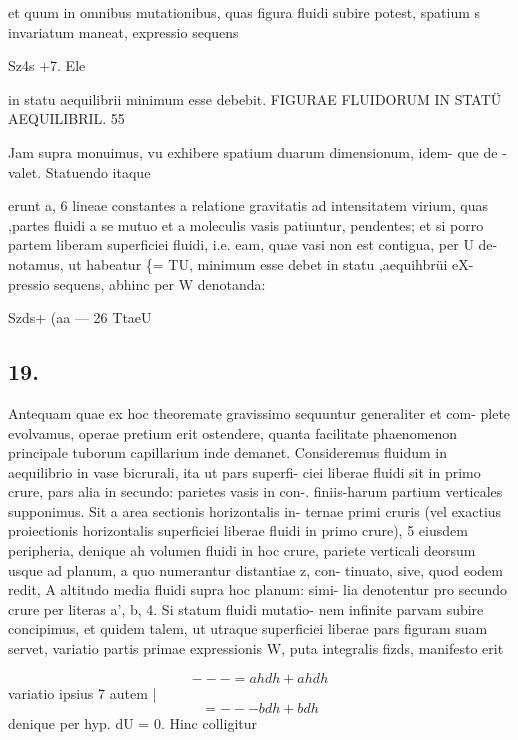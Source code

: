 \documentclass[12pt,a4paper]{article}
\begin{document}
et quum   in omnibus    mutationibus,      quas figura fluidi subire potest, spatium s
invariatum maneat,     expressio sequens

Sz4s +7.                     Ele

in statu aequilibrii minimum esse debebit.
FIGURAE FLUIDORUM IN STATÜ AEQUILIBRIL.                           55

Jam supra monuimus, vu exhibere spatium duarum dimensionum,                    idem-
que de -         valet.   Statuendo itaque



erunt       a, 6 lineae constantes a relatione gravitatis ad intensitatem virium,           quas
,partes fluidi a se mutuo et a moleculis vasis patiuntur, pendentes; et si porro
partem liberam superficiei fluidi, i.e. eam, quae vasi non est contigua, per U de-
notamus, ut habeatur \{= TU,       minimum esse debet in statu ,aequihbrüi eX-
pressio sequens, abhinc per W denotanda:

Szds+ (aa --- 26           TtaeU



\subsection*{19.}

Antequam quae ex hoc theoremate gravissimo sequuntur generaliter et com-
plete evolvamus,  operae pretium erit ostendere,               quanta facilitate phaenomenon
principale tuborum capillarium inde demanet.
Consideremus fluidum in aequilibrio in vase bicrurali, ita ut pars superfi-
ciei liberae fluidi sit in primo crure,        pars alia in secundo:     parietes vasis in con-.
finiis-harum partium verticales supponimus.                Sit a area sectionis horizontalis in-
ternae primi cruris (vel exactius proiectionis horizontalis superficiei liberae fluidi
in primo crure), 5 eiusdem peripheria, denique ah volumen fluidi in hoc crure,
pariete verticali deorsum usque ad planum, a quo numerantur distantiae z, con-
tinuato, sive, quod eodem redit, A altitudo media fluidi supra hoc planum: simi-
lia denotentur pro secundo crure per literas a', b, 4.              Si statum fluidi mutatio-
nem infinite parvam subire concipimus,            et quidem talem, ut utraque superficiei
liberae pars figuram       suam    servet,   variatio partis primae expressionis      W,   puta
integralis fizds,      manifesto erit

\[                                        ---= ahdh+ ahdh\]
variatio ipsius 7 autem                                |
\[        =                               --- bdh+bdh\]
denique per hyp. dU = 0. Hinc colligitur
\end{document}

